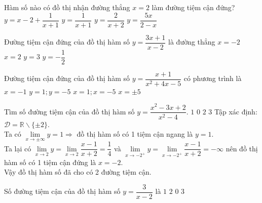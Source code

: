 \begin{ex}
	Hàm số nào có đồ thị nhận đường thẳng $x = 2$ làm đường tiệm cận đứng?
	\choice
	{$y=x-2+\dfrac{1}{x+1}$}
	{$y=\dfrac{1}{x+1}$}
	{$y=\dfrac{2}{x+2}$}
	{\True $y=\dfrac{5x}{2-x}$}
\end{ex}
\begin{ex}
	Đường tiệm cận đứng của đồ thị hàm số $y=\dfrac{3x+1}{x-2}$ là đường thẳng
	\choice
	{$x=-2$}
	{\True $x=2$}
	{$y=3$}
	{$y=-\dfrac{1}{2}$}
\end{ex}
\begin{ex}
	Đường tiệm cận đứng của đồ thị hàm số $y=\dfrac{x+1}{x^2+4x-5}$ có phương trình là
	\choice
	{$x=-1$}
	{$y=1;y=-5$}
	{\True $x=1;x=-5$}
	{$x=\pm 5$}
\end{ex}
\begin{ex}
	Tìm số đường tiệm cận của đồ thị hàm số $ y = \dfrac{x^2 - 3x + 2}{x^2 - 4}. $
	\choice
	{$1$}
	{$ 0$}
	{\True $2$}
	{$3$}
	\loigiai
	{
		Tập xác định: $ \mathscr D = \mathbb{R} \backslash \{\pm2 \} $.\\
		Ta có $ \lim \limits_{x \to \pm  \infty} y = 1 \Rightarrow  $ đồ thị hàm số có 1 tiệm cận ngang là $ y = 1. $\\
		Ta lại có $\lim \limits_{x \to 2} y =  \lim \limits_{x \to 2} \dfrac{x-1}{x+2} = \dfrac{1}{4} $ và $\lim \limits_{x \to -2^+} y =  \lim \limits_{x \to -2^+} \dfrac{x-1}{x+2} = -\infty$ nên đồ thị hàm số có 1 tiệm cận đứng là $ x = -2. $\\
		Vậy đồ thị hàm số đã cho có 2 đường tiệm cận.
	}
\end{ex}
\begin{ex}
	Số đường tiệm cận của đồ thị hàm số $y=\dfrac{3}{x-2}$ là
	\choice
	{$1$}
	{\True $2$}
	{$0$}
	{$3$}
\end{ex}
